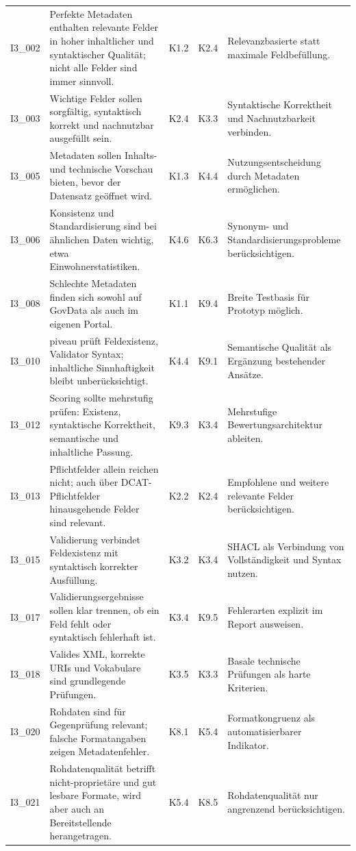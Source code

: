 \begin{longtable}{p{0.9cm} p{6cm} p{0.9cm} p{0.9cm} p{6cm}}
\midrule
I3\_002 & Perfekte Metadaten enthalten relevante Felder in hoher inhaltlicher und syntaktischer Qualität; nicht alle Felder sind immer sinnvoll. & K1.2 & K2.4 & Relevanzbasierte statt maximale Feldbefüllung. \\
I3\_003 & Wichtige Felder sollen sorgfältig, syntaktisch korrekt und nachnutzbar ausgefüllt sein. & K2.4 & K3.3 & Syntaktische Korrektheit und Nachnutzbarkeit verbinden. \\
I3\_005 & Metadaten sollen Inhalts- und technische Vorschau bieten, bevor der Datensatz geöffnet wird. & K1.3 & K4.4 & Nutzungsentscheidung durch Metadaten ermöglichen. \\
I3\_006 & Konsistenz und Standardisierung sind bei ähnlichen Daten wichtig, etwa Einwohnerstatistiken. & K4.6 & K6.3 & Synonym- und Standardisierungsprobleme berücksichtigen. \\
I3\_008 & Schlechte Metadaten finden sich sowohl auf GovData als auch im eigenen Portal. & K1.1 & K9.4 & Breite Testbasis für Prototyp möglich. \\
I3\_010 & piveau prüft Feldexistenz, Validator Syntax; inhaltliche Sinnhaftigkeit bleibt unberücksichtigt. & K4.4 & K9.1 & Semantische Qualität als Ergänzung bestehender Ansätze. \\
I3\_012 & Scoring sollte mehrstufig prüfen: Existenz, syntaktische Korrektheit, semantische und inhaltliche Passung. & K9.3 & K3.4 & Mehrstufige Bewertungsarchitektur ableiten. \\
I3\_013 & Pflichtfelder allein reichen nicht; auch über DCAT-Pflichtfelder hinausgehende Felder sind relevant. & K2.2 & K2.4 & Empfohlene und weitere relevante Felder berücksichtigen. \\
I3\_015 & Validierung verbindet Feldexistenz mit syntaktisch korrekter Ausfüllung. & K3.2 & K3.4 & SHACL als Verbindung von Vollständigkeit und Syntax nutzen. \\
I3\_017 & Validierungsergebnisse sollen klar trennen, ob ein Feld fehlt oder syntaktisch fehlerhaft ist. & K3.4 & K9.5 & Fehlerarten explizit im Report ausweisen. \\
I3\_018 & Valides XML, korrekte URIs und Vokabulare sind grundlegende Prüfungen. & K3.5 & K3.3 & Basale technische Prüfungen als harte Kriterien. \\
I3\_020 & Rohdaten sind für Gegenprüfung relevant; falsche Formatangaben zeigen Metadatenfehler. & K8.1 & K5.4 & Formatkongruenz als automatisierbarer Indikator. \\
I3\_021 & Rohdatenqualität betrifft nicht-proprietäre und gut lesbare Formate, wird aber auch an Bereitstellende herangetragen. & K5.4 & K8.5 & Rohdatenqualität nur angrenzend berücksichtigen. \\

\end{longtable}
